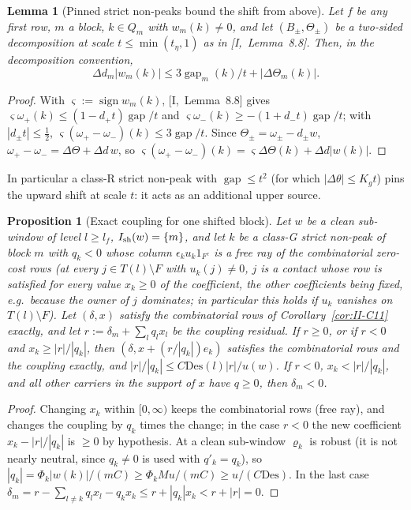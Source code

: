 \documentclass[10pt]{amsart}
\newtheorem{lemma}[theorem]{Lemma}
\newtheorem{proposition}[theorem]{Proposition}
\theoremstyle{definition}
\theoremstyle{remark}
\newcommand{\sgn}{\operatorname{sign}}
\newcommand{\gap}{\operatorname{gap}}
\begin{document}
\begin{lemma}[Pinned strict non-peaks bound the shift from above]\label{lem:II-Rpin}
Let $f$ be any first row, $m$ a block, $k\in Q_m$ with $w_m(k)\ne0$, and let $(B_\pm,
\Theta_\pm)$ be a two-sided decomposition at scale $t\le\min(t_\eta,1)$ as in
[I,~Lemma~8.8].  Then, in the decomposition convention,
\[
 \Delta d_m|w_m(k)|\le3\gap_m(k)/t+|\Delta\Theta_m(k)| .
\]
\end{lemma}

\begin{proof}
With $\varsigma:=\sgn w_m(k)$, [I,~Lemma~8.8] gives $\varsigma\omega_+(k)\le(1-d_+t)\gap/t$ and
$\varsigma\omega_-(k)\ge-(1+d_-t)\gap/t$; with $|d_\pm t|\le\frac12$, $\varsigma(\omega_+-\omega_-)(k)\le3\gap/t$.
Since $\Theta_\pm=\omega_\pm-d_\pm w$, $\omega_+-\omega_-=\Delta\Theta+\Delta d\,w$, so $\varsigma(\omega_+-\omega_-)(k)=
\varsigma\Delta\Theta(k)+\Delta d|w(k)|$.
\end{proof}

In particular a class-R strict non-peak with $\gap\le t^2$ (for which $|\Delta\theta|\le K_gt$)
pins the upward shift at scale $t$: it acts as an additional upper source.

\begin{proposition}[Exact coupling for one shifted block]\label{prop:II-S1}
Let $w$ be a clean sub-window of level $l\ge l_f$, $I_{\rm sh}(w)=\{m\}$, and let $k$ be a
class-G strict non-peak of block $m$ with $q_k<0$ whose column $\epsilon_ku_k1_{F^c}$ is a
\emph{free ray} of the combinatorial zero-cost rows \textup{(}at every $j\in
T(l)\setminus F$ with $u_k(j)\ne0$, $j$ is a contact whose row is satisfied for
every value $x_k\ge0$ of the coefficient, the other coefficients being fixed,
e.g.\ because the owner of $j$ dominates; in particular this holds if $u_k$
vanishes on $T(l)\setminus F$\textup{)}.  Let $(\delta,x)$ satisfy the combinatorial rows of
Corollary~\textup{\ref{cor:II-C11}} exactly, and let $r:=\delta_m+\sum_lq_lx_l$ be the
coupling residual.  If $r\ge0$, or if $r<0$ and $x_k\ge|r|/|q_k|$, then $(\delta,x+(r/|q_k|)
e_k)$ satisfies the combinatorial rows and the coupling exactly, and
$|r|/|q_k|\le C\mathrm{Des}(l)|r|/u(w)$.  If $r<0$, $x_k<|r|/|q_k|$, and all other carriers in the
support of $x$ have $q\ge0$, then $\delta_m<0$.
\end{proposition}

\begin{proof}
Changing $x_k$ within $[0,\infty)$ keeps the combinatorial rows (free ray), and
changes the coupling by $q_k$ times the change; in the case $r<0$ the new
coefficient $x_k-|r|/|q_k|$ is $\ge0$ by hypothesis.  At a clean sub-window $\varrho_k$ is robust (it is
not nearly neutral, since $q_k\ne0$ is used with $q'_k=q_k$), so $|q_k|=\Phi_k|w(k)|/(mC)\ge
\Phi_kMu/(mC)\ge u/(C\mathrm{Des})$.  In the last case $\delta_m=r-\sum_{l\ne k}q_lx_l-q_kx_k\le r+
|q_k|x_k<r+|r|=0$.
\end{proof}
\end{document}
